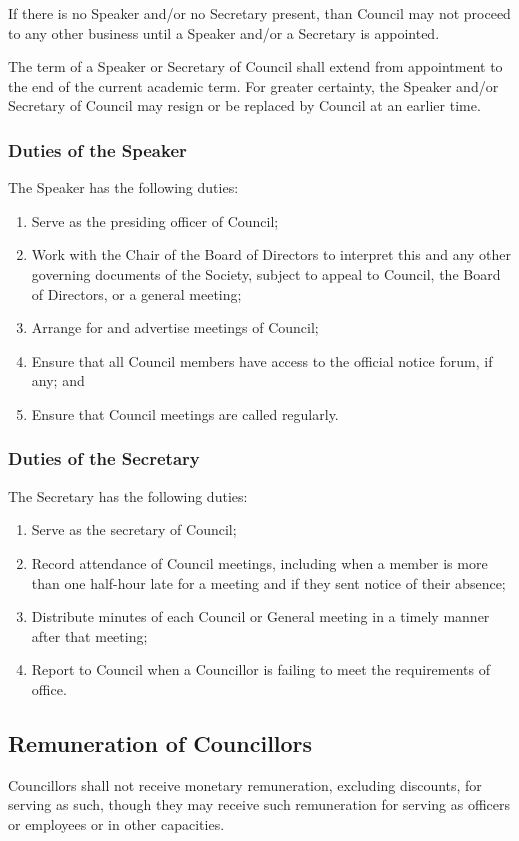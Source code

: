 If there is no Speaker and/or no Secretary present, than Council may
not proceed to any other business until a Speaker and/or a Secretary is
appointed. 

The term of a Speaker or Secretary of Council shall extend from 
appointment to the end of the current academic term. For greater certainty,
the Speaker and/or Secretary of Council may resign or be replaced by
Council at an earlier time. 

\subsubsection{Duties of the Speaker}
The Speaker has the following duties:
\begin{enumerate}
  \item Serve as the presiding officer of Council;
  \item Work with the Chair of the Board of Directors to interpret this and any
      other governing documents of the Society, subject to appeal to 
      Council, the Board of Directors, or a general meeting;
  \item Arrange for and advertise meetings of Council;
  \item Ensure that all Council members have access to the official
      notice forum, if any; and
  \item Ensure that Council meetings are called regularly.
\end{enumerate}

\subsubsection{Duties of the Secretary}
The Secretary has the following duties:
\begin{enumerate}
  \item Serve as the secretary of Council;
  \item Record attendance of Council meetings, including when a
      member is more than one half-hour late for a meeting and if they sent
      notice of their absence;
  \item Distribute minutes of each Council or General meeting in a
      timely manner after that meeting;
  \item Report to Council when a Councillor is failing to meet the
      requirements of office.
\end{enumerate}

\subsection{Remuneration of Councillors}

Councillors shall not receive monetary remuneration, excluding discounts, 
for serving as such, though they may receive such remuneration for serving 
as officers or employees or in other capacities.
